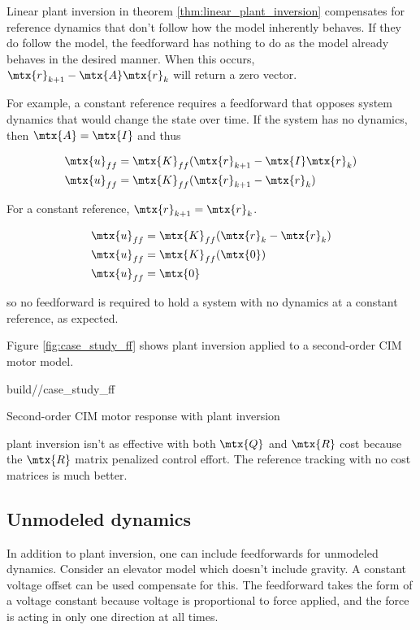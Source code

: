 Linear \gls{plant} inversion in theorem \ref{thm:linear_plant_inversion}
compensates for \gls{reference} dynamics that don't follow how the \gls{model}
inherently behaves. If they do follow the \gls{model}, the feedforward has
nothing to do as the \gls{model} already behaves in the desired manner. When
this occurs, $\mtx{r}_{k+1} - \mtx{A}\mtx{r}_k$ will return a zero vector.

For example, a constant \gls{reference} requires a feedforward that opposes
\gls{system} dynamics that would change the \gls{state} over time. If the
\gls{system} has no dynamics, then $\mtx{A} = \mtx{I}$ and thus

\begin{align*}
  \mtx{u}_{ff} &= \mtx{K}_{ff} (\mtx{r}_{k+1} - \mtx{I}\mtx{r}_k) \\
  \mtx{u}_{ff} &= \mtx{K}_{ff} (\mtx{r}_{k+1} - \mtx{r}_k)
\end{align*}

For a constant \gls{reference}, $\mtx{r}_{k+1} = \mtx{r}_k$.

\begin{align*}
  \mtx{u}_{ff} &= \mtx{K}_{ff} (\mtx{r}_k - \mtx{r}_k) \\
  \mtx{u}_{ff} &= \mtx{K}_{ff} (\mtx{0}) \\
  \mtx{u}_{ff} &= \mtx{0}
\end{align*}

so no feedforward is required to hold a \gls{system} with no dynamics at a
constant \gls{reference}, as expected.

Figure \ref{fig:case_study_ff} shows \gls{plant} inversion applied to a
second-order CIM motor model.

\begin{svg}{build/\chapterpath/case_study_ff}
  \caption{Second-order CIM motor response with plant inversion}
  \label{fig:case_study_ff}
\end{svg}

\Gls{plant} inversion isn't as effective with both $\mtx{Q}$ and $\mtx{R}$ cost
because the $\mtx{R}$ matrix penalized \gls{control effort}. The \gls{reference}
\gls{tracking} with no cost matrices is much better.

\subsection{Unmodeled dynamics}

In addition to \gls{plant} inversion, one can include feedforwards for unmodeled
dynamics. Consider an elevator model which doesn't include gravity. A constant
voltage offset can be used compensate for this. The feedforward takes the form
of a voltage constant because voltage is proportional to force applied, and the
force is acting in only one direction at all times.

